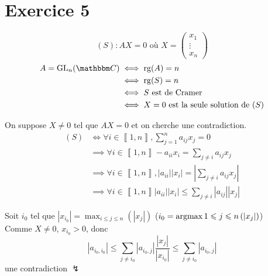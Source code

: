 \part{Exercice 5}

\[
	(S): AX = 0 \text{ où } X = \begin{pmatrix}
		x_1\\
		\vdots\\
		x_n
	\end{pmatrix}
\]
\begin{align*}
	A = \mathrm{GL}_n(\C) &\iff \rg(A) = n\\
							 &\iff \rg(S) = n\\
							 &\iff S \text{ est de Cramer}\\
							 &\iff X = 0 \text{ est la seule solution de } (S)
\end{align*}

On suppose $X \neq 0$ tel que $AX = 0$ et on cherche une contradiction.\\

\begin{align*}
	(S) &\iff \forall i \in \left\llbracket 1,n \right\rrbracket , \sum_{j=1}^{n} a_{ij} x_j=0\\
			&\implies \forall i \in \left\llbracket 1,n \right\rrbracket -a_{ii}x_i = \sum_{j \neq i} a_{ij}x_j\\
			&\implies \forall i \in \left\llbracket 1,n \right\rrbracket, \left| a_{ii} \right| \left| x_i \right| =\left| \sum_{j\neq i}a_{ij}x_j \right| \\
			&\implies\forall i \in \left\llbracket 1,n \right\rrbracket \left| a_{ii} \right| \left| x_i \right| \le \sum_{j \neq i} \left| a_{ij} \right| \left| x_j \right| 
\end{align*}

Soit $i_0$ tel que $\left| x_{i_0} \right| = \max_{i\le j\le n}\left( \left| x_j \right|  \right)$ ($i_0 = \operatorname{argmax}{1\leqslant j\leqslant n}\left( \left| x_j \right|  \right)$)\\
Comme $X \neq 0$, $x_{i_0}>0$, donc \[
	\left| a_{i_0,i_0} \right| \le \sum_{j \neq i_0} \left| a_{i_0,j} \right| \frac{\left| x_j \right| }{\left| x_{i_0} \right| } \le \sum_{j \neq i_0}\left| a_{i_0,j} \right| 
\] une contradiction $\lightning$\\
